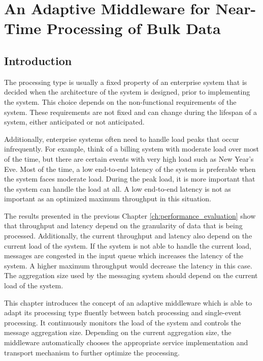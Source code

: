 \chapter{An Adaptive Middleware for Near-Time Processing of Bulk Data}\label{ch:adaptive_middleware}

\section{Introduction}\label{sec:introduction}
The processing type is usually a fixed property of an enterprise system that is decided when the architecture of the system is designed, prior to implementing the system. This choice depends on the non-functional requirements of the system. These requirements are not fixed and can change during the lifespan of a system, either anticipated or not anticipated.

Additionally, enterprise systems often need to handle load peaks that occur infrequently. For example, think of a billing system with moderate load over most of the time, but there are certain events with very high load such as New Year's Eve. Most of the time, a low end-to-end latency of the system is preferable when the system faces moderate load. During the peak load, it is more important that the system can handle the load at all. A low end-to-end latency is not as important as an optimized maximum throughput in this situation.

The results presented in the previous Chapter \ref{ch:performance_evaluation} show that throughput and latency depend on the granularity of data that is being processed. Additionally, the current throughput and latency also depend on the current load of the system. If the system is not able to handle the current load, messages are congested in the input queue which increases the latency of the system. A higher maximum throughput would decrease the latency in this case. The aggregation size used by the messaging system should depend on the current load of the system.

This chapter introduces the concept of an adaptive middleware which is able to adapt its processing type fluently between batch processing and single-event processing. It continuously monitors the load of the system and controls the message aggregation size. Depending on the current aggregation size, the middleware automatically chooses the appropriate service implementation and transport mechanism to further optimize the processing.

